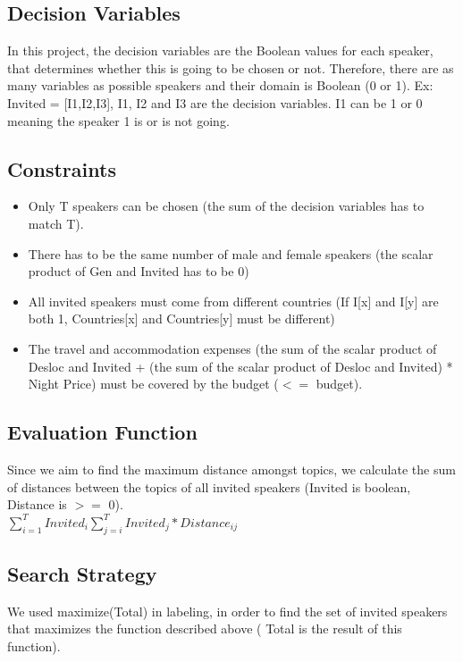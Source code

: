 \documentclass[runningheads,a4paper]{llncs}
\begin{document}
\subsection{Decision Variables}

In this project, the decision variables are the Boolean values for each speaker, that determines whether this is going to be chosen or not. Therefore, there are as many variables as possible speakers and their domain is Boolean (0 or 1). Ex: Invited = [I1,I2,I3], I1, I2 and I3 are the decision variables. I1 can be 1 or 0 meaning the speaker 1 is or is not going.

\subsection{Constraints}

\begin{itemize}
\item Only T speakers can be chosen (the sum of the decision variables has to match T).
\item There has to be the same number of male and female speakers (the scalar product of Gen and Invited has to be 0)
\item All invited speakers must come from different countries (If I[x] and I[y] are both 1, Countries[x] and Countries[y] must be different)
\item The travel and accommodation expenses (the sum of the scalar product of Desloc and Invited + (the sum of the scalar product of Desloc and Invited) * Night Price) must be covered by the budget ($<=$ budget).
\end{itemize}

\subsection{Evaluation Function}

Since we aim to find the maximum distance amongst topics, we calculate the sum of distances between the topics of all invited speakers (Invited is boolean, Distance is $>=$ 0).\\

$\sum_{i=1}^{T} Invited_i{ \sum_{j=i}^{T} Invited_j * Distance_{ij} }$ 

\subsection{Search Strategy}

We used maximize(Total) in labeling, in order to find the set of invited speakers that maximizes the function described above ( Total is the result of this function).
\end{document}
